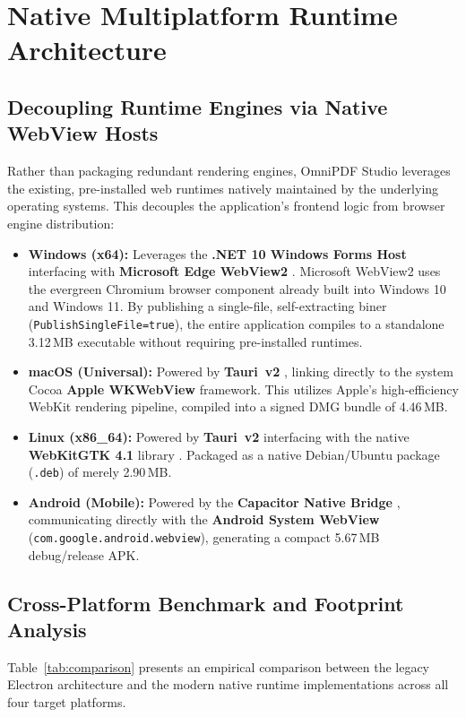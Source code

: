 \documentclass[11pt,a4paper]{article}
\begin{document}
\section{Native Multiplatform Runtime Architecture}
\label{sec:arch}

\subsection{Decoupling Runtime Engines via Native WebView Hosts}
Rather than packaging redundant rendering engines, OmniPDF Studio leverages the existing, pre-installed web runtimes natively maintained by the underlying operating systems. This decouples the application's frontend logic from browser engine distribution:

\begin{itemize}
    \item \textbf{Windows (x64):} Leverages the \textbf{.NET 10 Windows Forms Host} interfacing with \textbf{Microsoft Edge WebView2} \cite{webview2023}. Microsoft WebView2 uses the evergreen Chromium browser component already built into Windows 10 and Windows 11. By publishing a single-file, self-extracting biner (\texttt{PublishSingleFile=true}), the entire application compiles to a standalone 3.12\,MB executable without requiring pre-installed runtimes.
    \item \textbf{macOS (Universal):} Powered by \textbf{Tauri~v2} \cite{tauri2024}, linking directly to the system Cocoa \textbf{Apple WKWebView} framework. This utilizes Apple's high-efficiency WebKit rendering pipeline, compiled into a signed DMG bundle of 4.46\,MB.
    \item \textbf{Linux (x86\_64):} Powered by \textbf{Tauri~v2} interfacing with the native \textbf{WebKitGTK 4.1} library \cite{webkitgtk2024}. Packaged as a native Debian/Ubuntu package (\texttt{.deb}) of merely 2.90\,MB.
    \item \textbf{Android (Mobile):} Powered by the \textbf{Capacitor Native Bridge} \cite{capacitor2023}, communicating directly with the \textbf{Android System WebView} (\texttt{com.google.android.webview}), generating a compact 5.67\,MB debug/release APK.
\end{itemize}

\subsection{Cross-Platform Benchmark and Footprint Analysis}
Table~\ref{tab:comparison} presents an empirical comparison between the legacy Electron architecture and the modern native runtime implementations across all four target platforms.
\end{document}
